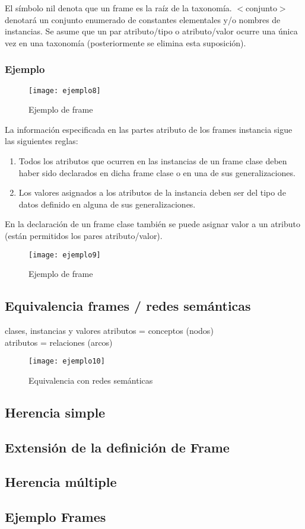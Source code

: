 \documentclass[12pt]{article}
\begin{document}
El símbolo nil denota que un frame es la raíz de la taxonomía. $<$conjunto$>$ denotará un conjunto enumerado de constantes elementales y/o nombres de instancias. Se asume que un par atributo/tipo o atributo/valor ocurre una única vez en una taxonomía (posteriormente se elimina esta suposición).

\subsubsection{Ejemplo}
\begin{figure}[H]
\centering
\texttt{[image: ejemplo8]}
\caption{Ejemplo de frame} \label{fig:ejemplo8}
\end{figure}

La información especificada en las partes atributo de los frames instancia sigue las siguientes reglas:
\begin{enumerate}
\item Todos los atributos que ocurren en las instancias de un frame clase deben haber sido declarados en dicha frame clase o en una de sus generalizaciones.
\item Los valores asignados a los atributos de la instancia deben ser del tipo de datos definido en alguna de sus generalizaciones.
\end{enumerate}

En la declaración de un frame clase también se puede asignar valor a un atributo (están permitidos los pares atributo/valor).

\begin{figure}[H]
\centering
\texttt{[image: ejemplo9]}
\caption{Ejemplo de frame} \label{fig:ejemplo9}
\end{figure}

\subsection{Equivalencia frames / redes semánticas}
clases, instancias y valores atributos = conceptos (nodos)\\
atributos = relaciones (arcos)

\begin{figure}[H]
\centering
\texttt{[image: ejemplo10]}
\caption{Equivalencia con redes semánticas}
\label{fig:ejemplo10}
\end{figure}

\subsection{Herencia simple}


\subsection{Extensión de la definición de Frame}


\subsection{Herencia múltiple}


\subsection{Ejemplo Frames}
\end{document}
